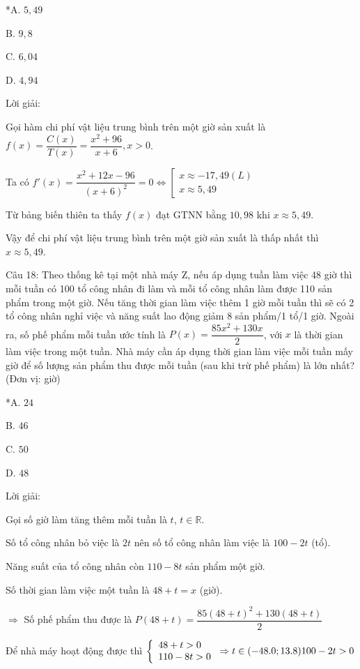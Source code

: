 \documentclass[a4paper,12pt]{article}
\begin{document}
*A. \(5,49\)

B. \(9,8\)

C. \(6,04\)

D. \(4,94\)

Lời giải:


Gọi hàm chi phí vật liệu trung bình trên một giờ sản xuất là \(f(x)=\dfrac{C(x)}{T(x)}=\dfrac{x^2+96}{x+6}, x>0\).

Ta có \(f'(x)=\dfrac{x^2+12x-96}{(x+6)^2}=0 \Leftrightarrow \left[\begin{array}{l}x \approx -17,49(L) \\ x \approx 5,49\end{array}\right.\)

Từ bảng biến thiên ta thấy \(f(x)\) đạt GTNN bằng \(10,98\) khi \(x \approx 5,49\).

Vậy để chi phí vật liệu trung bình trên một giờ sản xuất là thấp nhất thì \(x \approx 5,49\).




Câu 18: Theo thống kê tại một nhà máy Z, nếu áp dụng tuần làm việc 48 giờ thì mỗi tuần có 100 tổ công nhân đi làm và mỗi tổ công nhân làm được 110 sản phẩm trong một giờ. Nếu tăng thời gian làm việc thêm 1 giờ mỗi tuần thì sẽ có 2 tổ công nhân nghỉ việc và năng suất lao động giảm 8 sản phẩm/1 tổ/1 giờ. Ngoài ra, số phế phẩm mỗi tuần ước tính là \(P(x)=\dfrac{85x^2 + 130x}{2}\), với \(x\) là thời gian làm việc trong một tuần. Nhà máy cần áp dụng thời gian làm việc mỗi tuần mấy giờ để số lượng sản phẩm thu được mỗi tuần (sau khi trừ phế phẩm) là lớn nhất? (Đơn vị: giờ)

*A. \(24\)

B. \(46\)

C. \(50\)

D. \(48\)

Lời giải:


Gọi số giờ làm tăng thêm mỗi tuần là \(t\), \(t \in \mathbb{R}\).

Số tổ công nhân bỏ việc là \(2 t\) nên số tổ công nhân làm việc là \(100 - 2 t\) (tổ).

Năng suất của tổ công nhân còn \(110 - 8 t\) sản phẩm một giờ.

Số thời gian làm việc một tuần là \(48 + t = x\) (giờ).

\(\Rightarrow\) Số phế phẩm thu được là \(P(48 + t) = \dfrac{85(48 + t)^2 + 130(48 + t)}{2}\)

Để nhà máy hoạt động được thì \(\left\{\begin{array}{l}48 + t > 0 \\ 110 - 8 t > 0\end{array}\right. \Rightarrow t \in(-48.0 ; 13.8) \\ 100 - 2 t > 0\)
\end{document}
